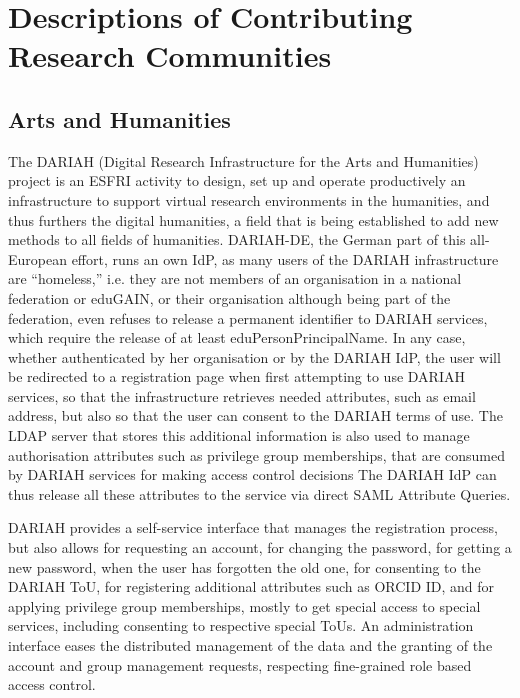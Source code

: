 \documentclass[fleqn,10pt]{wlscirep}
\begin{document}
{

\appendix
\newpage



\newpage
\section{Descriptions of Contributing Research Communities}

\subsection{Arts and Humanities}
The DARIAH (Digital Research Infrastructure for the Arts and Humanities)\cite{dariah} project is an ESFRI activity to design, set up and operate productively an infrastructure to support virtual research environments in the humanities, and thus furthers the digital humanities, a field that is being established to add new methods to all fields of humanities. DARIAH-DE, the German part of this all-European effort, runs an own IdP, as many users of the DARIAH infrastructure are “homeless,” i.e. they are not members of an organisation in a national federation or eduGAIN, or their organisation although being part of the federation, even refuses to release a permanent identifier to DARIAH services, which require the release of at least eduPersonPrincipalName. In any case, whether authenticated by her organisation or by the DARIAH IdP, the user will be redirected to a registration page when first attempting to use DARIAH services, so that the infrastructure retrieves needed attributes, such as email address, but also so that the user can consent to the DARIAH terms of use. The LDAP server that stores this additional information is also used to manage authorisation attributes such as privilege group memberships, that are consumed by DARIAH services for making access control decisions The DARIAH IdP can thus release all these attributes to the service via direct SAML Attribute Queries.

DARIAH provides a self-service interface that manages the registration process, but also allows for requesting an account, for changing the password, for getting a new password, when the user has forgotten the old one, for consenting to the DARIAH ToU, for registering additional attributes such as ORCID ID, and for applying privilege group memberships, mostly to get special access to special services, including consenting to respective special ToUs. An administration interface eases the distributed management of the data and the granting of the account and group management requests, respecting fine-grained role based access control.

}
\end{document}
